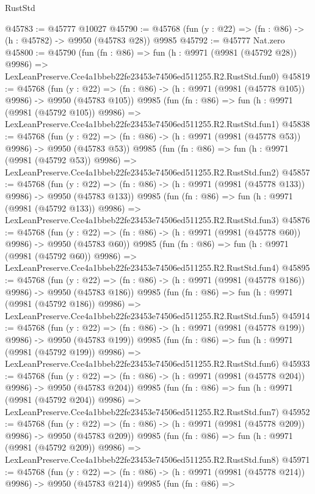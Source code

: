 \begin{lexlean}{RustStd}
\begin{coremodule}
@45783 := @45777 @10027
@45790 := @45768 (fun (y : @22) => (fn : @86) -> (h : @45782) -> @9950 (@45783 @28)) @9985
@45792 := @45777 Nat.zero
@45800 := @45790
    (fun (fn : @86) =>
    fun (h : @9971 (@9981 (@45792 @28)) @9986) =>
    LexLeanPreserve.Cce4a1bbeb22fe23453e74506ed511255.R2.RustStd.fun0)
@45819 := @45768
    (fun (y : @22) => (fn : @86) -> (h : @9971 (@9981 (@45778 @105)) @9986) -> @9950 (@45783 @105))
    @9985
    (fun (fn : @86) =>
    fun (h : @9971 (@9981 (@45792 @105)) @9986) =>
    LexLeanPreserve.Cce4a1bbeb22fe23453e74506ed511255.R2.RustStd.fun1)
@45838 := @45768
    (fun (y : @22) => (fn : @86) -> (h : @9971 (@9981 (@45778 @53)) @9986) -> @9950 (@45783 @53))
    @9985
    (fun (fn : @86) =>
    fun (h : @9971 (@9981 (@45792 @53)) @9986) =>
    LexLeanPreserve.Cce4a1bbeb22fe23453e74506ed511255.R2.RustStd.fun2)
@45857 := @45768
    (fun (y : @22) => (fn : @86) -> (h : @9971 (@9981 (@45778 @133)) @9986) -> @9950 (@45783 @133))
    @9985
    (fun (fn : @86) =>
    fun (h : @9971 (@9981 (@45792 @133)) @9986) =>
    LexLeanPreserve.Cce4a1bbeb22fe23453e74506ed511255.R2.RustStd.fun3)
@45876 := @45768
    (fun (y : @22) => (fn : @86) -> (h : @9971 (@9981 (@45778 @60)) @9986) -> @9950 (@45783 @60))
    @9985
    (fun (fn : @86) =>
    fun (h : @9971 (@9981 (@45792 @60)) @9986) =>
    LexLeanPreserve.Cce4a1bbeb22fe23453e74506ed511255.R2.RustStd.fun4)
@45895 := @45768
    (fun (y : @22) => (fn : @86) -> (h : @9971 (@9981 (@45778 @186)) @9986) -> @9950 (@45783 @186))
    @9985
    (fun (fn : @86) =>
    fun (h : @9971 (@9981 (@45792 @186)) @9986) =>
    LexLeanPreserve.Cce4a1bbeb22fe23453e74506ed511255.R2.RustStd.fun5)
@45914 := @45768
    (fun (y : @22) => (fn : @86) -> (h : @9971 (@9981 (@45778 @199)) @9986) -> @9950 (@45783 @199))
    @9985
    (fun (fn : @86) =>
    fun (h : @9971 (@9981 (@45792 @199)) @9986) =>
    LexLeanPreserve.Cce4a1bbeb22fe23453e74506ed511255.R2.RustStd.fun6)
@45933 := @45768
    (fun (y : @22) => (fn : @86) -> (h : @9971 (@9981 (@45778 @204)) @9986) -> @9950 (@45783 @204))
    @9985
    (fun (fn : @86) =>
    fun (h : @9971 (@9981 (@45792 @204)) @9986) =>
    LexLeanPreserve.Cce4a1bbeb22fe23453e74506ed511255.R2.RustStd.fun7)
@45952 := @45768
    (fun (y : @22) => (fn : @86) -> (h : @9971 (@9981 (@45778 @209)) @9986) -> @9950 (@45783 @209))
    @9985
    (fun (fn : @86) =>
    fun (h : @9971 (@9981 (@45792 @209)) @9986) =>
    LexLeanPreserve.Cce4a1bbeb22fe23453e74506ed511255.R2.RustStd.fun8)
@45971 := @45768
    (fun (y : @22) => (fn : @86) -> (h : @9971 (@9981 (@45778 @214)) @9986) -> @9950 (@45783 @214))
    @9985
    (fun (fn : @86) =>

\end{coremodule}
\end{lexlean}
